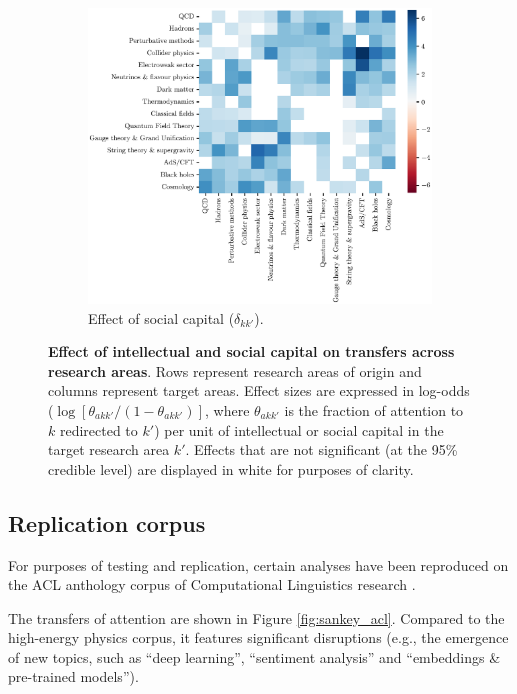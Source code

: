 \documentclass{article}
\begin{document}
\begin{figure}[H]
\begin{subfigure}{.5\textwidth}
    \includegraphics[width=1\textwidth]{Fig19b}
    \caption{Effect of social capital ($\delta_{kk'}$).}
    \label{fig:social-capital-effect_2000-2009}
\end{subfigure}
\caption{\textbf{Effect of intellectual and social capital on transfers across research areas}. Rows represent research areas of origin and columns represent target areas. Effect sizes are expressed in log-odds ($\log {[\theta_{akk'}/(1-\theta_{akk'})]}$, where $\theta_{akk'}$ is the fraction of attention to $k$ redirected to $k'$) per unit of intellectual or social capital in the target research area $k'$. Effects that are not significant (at the 95\% credible level) are displayed in white for purposes of clarity.}
\end{figure}

\subsection{\label{appendix:hep_vs_acl}Replication corpus}

For purposes of testing and replication, certain analyses have been reproduced on the ACL anthology corpus of Computational Linguistics research .

The transfers of attention are shown in Figure \ref{fig:sankey_acl}. Compared to the high-energy physics corpus, it features significant disruptions (e.g., the emergence of new topics, such as ``deep learning'', ``sentiment analysis'' and ``embeddings \& pre-trained models'').
\end{document}
